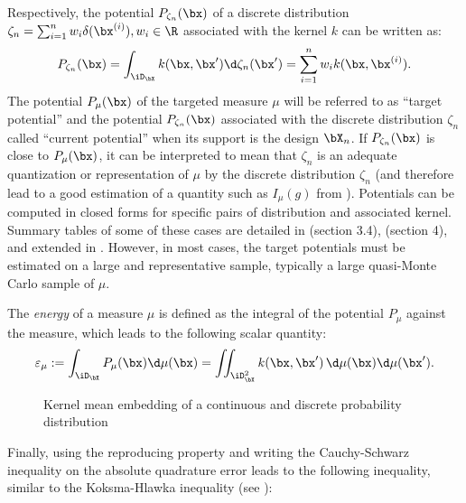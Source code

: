 Respectively, the potential $P_{\zeta_n}(\bx)$ of a discrete distribution $\zeta_n = \sum_{i=1}^{n} w_i \delta(\bx^{(i)}), w_i \in \R$ associated with the kernel $k$ can be written as:
\begin{equation}\label{eq:potential}
    P_{\zeta_n}(\bx) =  \int_{\iD_{\bX}} k(\bx, \bx') \d \zeta_n(\bx') = \sum_{i=1}^{n} w_i k(\bx, \bx^{(i)}).
\end{equation}
The potential $P_{\mu}(\bx)$ of the targeted measure $\mu$ will be referred to as ``target potential'' and the potential $P_{\zeta_n}(\bx)$ associated with the discrete distribution $\zeta_n$ called ``current potential'' when its support is the design $\bX_n$. 
If $P_{\zeta_n}(\bx)$ is close to $P_{\mu}(\bx)$, it can be interpreted to mean that $\zeta_n$ is an adequate quantization or representation of $\mu$ by the discrete distribution $\zeta_n$ (and therefore lead to a good estimation of a quantity such as $I_{\mu}(g)$ from ). 
Potentials can be computed in closed forms for specific pairs of distribution and associated kernel. 
Summary tables of some of these cases are detailed in \cite{briol_phd_2019} (section 3.4), \cite{pronzato_zhigljavsky_2020} (section 4), and extended in \cite{fekhari_iooss_2023}. 
However, in most cases, the target potentials must be estimated on a large and representative sample, typically a large quasi-Monte Carlo sample of $\mu$.

\medskip
\begin{definition}
The \emph{energy} of a measure $\mu$ is defined as the integral of the potential $P_\mu$ against the measure, which leads to the following scalar quantity:
\begin{equation}
    \varepsilon_\mu:= \int_{\iD_{\bX}} P_{\mu}(\bx) \d \mu(\bx) = \iint_{\iD_{\bX}^2} k(\bx, \bx')\, \d\mu(\bx) \d\mu(\bx').
\end{equation}
\label{eq:target_energy}
\end{definition}

\begin{figure}[!h]
    \centering
    
    \caption{Kernel mean embedding of a continuous and discrete probability distribution}
    \label{fig:kernel_mean_embedding}
\end{figure}
Finally, using the reproducing property and writing the Cauchy-Schwarz inequality on the absolute quadrature error leads to the following inequality, similar to the Koksma-Hlawka inequality  (see \cite{briol_oates_2019}): 

